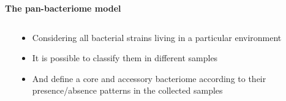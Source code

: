 \documentclass[10pt]{beamer}
\begin{document}
\else
\begin{frame}
	\vspace{3mm}
	\begin{overlayarea}{\textwidth}{0.95\textheight}
	\textbf{\Large{The pan-bacteriome model}}
	\begin{columns}
		\begin{column}{0.5\textwidth}
			\begin{center}
			\end{center}
		\end{column}
		\begin{column}{0.6\textwidth}
			\begin{itemize}
				\item<1-> Considering all bacterial strains living in a particular environment
				\item<2-> It is possible to classify them in different samples
				\item<3-> And define a core and accessory bacteriome according to their presence/absence patterns in the collected samples
			\end{itemize}
		\end{column}
	\end{columns}
	\vspace{5mm}
	\end{overlayarea}
\end{frame}
\fi

\end{document}

